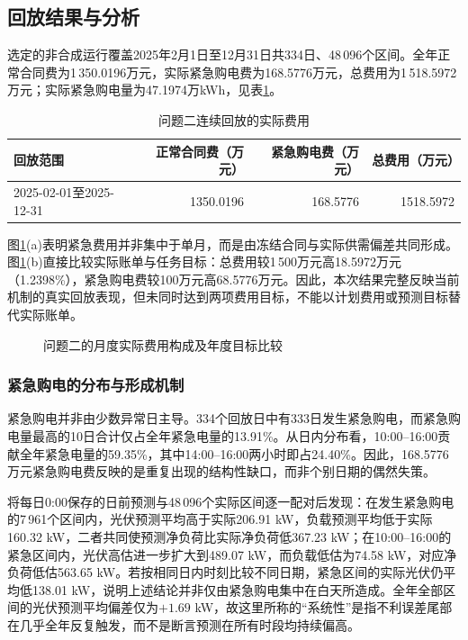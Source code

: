 \subsection{回放结果与分析}
选定的非合成运行覆盖2025年2月1日至12月31日共334日、48\,096个区间。全年正常合同费为1\,350.0196万元，实际紧急购电费为168.5776万元，总费用为1\,518.5972万元；实际紧急购电量为47.1974万kWh，见表\ref{tab:q2-cost}。

\begin{table}[H]
\centering
\small
\caption{问题二连续回放的实际费用}\label{tab:q2-cost}
\begin{tabular}{lrrr}
\toprule
回放范围 & 正常合同费（万元） & 紧急购电费（万元） & 总费用（万元）\\
\midrule
2025-02-01至2025-12-31 & 1350.0196 & 168.5776 & 1518.5972\\
\bottomrule
\end{tabular}
\end{table}

图\ref{fig:q2-costs}(a)表明紧急费用并非集中于单月，而是由冻结合同与实际供需偏差共同形成。图\ref{fig:q2-costs}(b)直接比较实际账单与任务目标：总费用较1\,500万元高18.5972万元（1.2398\%），紧急购电费较100万元高68.5776万元。因此，本次结果完整反映当前机制的真实回放表现，但未同时达到两项费用目标，不能以计划费用或预测目标替代实际账单。

\begin{figure}[H]
  \centering
  \caption{问题二的月度实际费用构成及年度目标比较}
  \label{fig:q2-costs}
\end{figure}

\subsubsection{紧急购电的分布与形成机制}
紧急购电并非由少数异常日主导。334个回放日中有333日发生紧急购电，而紧急购电量最高的10日合计仅占全年紧急电量的13.91\%。从日内分布看，10:00--16:00贡献全年紧急电量的59.35\%，其中14:00--16:00两小时即占24.40\%。因此，168.5776万元紧急购电费反映的是重复出现的结构性缺口，而非个别日期的偶然失策。

将每日0:00保存的日前预测与48\,096个实际区间逐一配对后发现：在发生紧急购电的7\,961个区间内，光伏预测平均高于实际206.91 kW，负载预测平均低于实际160.32 kW，二者共同使预测净负荷比实际净负荷低367.23 kW；在10:00--16:00的紧急区间内，光伏高估进一步扩大到489.07 kW，而负载低估为74.58 kW，对应净负荷低估563.65 kW。若按相同日内时刻比较不同日期，紧急区间的实际光伏仍平均低138.01 kW，说明上述结论并非仅由紧急购电集中在白天所造成。全年全部区间的光伏预测平均偏差仅为$+1.69$ kW，故这里所称的“系统性”是指不利误差尾部在几乎全年反复触发，而不是断言预测在所有时段均持续偏高。

